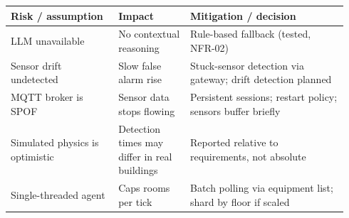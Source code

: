 \documentclass[11pt]{article}
\begin{document}
\begin{longtable}[]{@{}
  >{\raggedright\arraybackslash}p{0.30\linewidth}
  >{\raggedright\arraybackslash}p{0.20\linewidth}
  >{\raggedright\arraybackslash}p{0.44\linewidth}@{}}
\toprule
\textbf{Risk / assumption} & \textbf{Impact} & \textbf{Mitigation / decision} \\
\midrule
\endhead
LLM unavailable & No contextual reasoning & Rule-based fallback (tested, NFR-02) \\
Sensor drift undetected & Slow false alarm rise & Stuck-sensor detection via gateway; drift detection planned \\
MQTT broker is SPOF & Sensor data stops flowing & Persistent sessions; restart policy; sensors buffer briefly \\
Simulated physics is optimistic & Detection times may differ in real buildings & Reported relative to requirements, not absolute \\
Single-threaded agent & Caps rooms per tick & Batch polling via equipment list; shard by floor if scaled \\
\bottomrule
\end{longtable}
\end{document}
